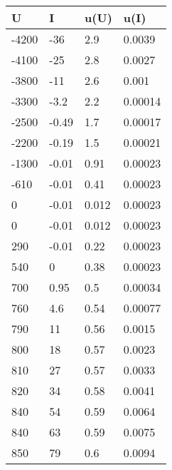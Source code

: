 \begin{table}[H]\centering 
 \begin{tabular}{|l|l|l|l|}
\hline
 \rowcolor[HTML]{EFEFEF} 
   U   &   I   &  u(U)  &  u(I)   \\ \hline

 -4200 &  -36  &  2.9   & 0.0039  \\ \hline
 -4100 &  -25  &  2.8   & 0.0027  \\ \hline
 -3800 &  -11  &  2.6   &  0.001  \\ \hline
 -3300 & -3.2  &  2.2   & 0.00014 \\ \hline
 -2500 & -0.49 &  1.7   & 0.00017 \\ \hline
 -2200 & -0.19 &  1.5   & 0.00021 \\ \hline
 -1300 & -0.01 &  0.91  & 0.00023 \\ \hline
 -610  & -0.01 &  0.41  & 0.00023 \\ \hline
   0   & -0.01 & 0.012  & 0.00023 \\ \hline
   0   & -0.01 & 0.012  & 0.00023 \\ \hline
  290  & -0.01 &  0.22  & 0.00023 \\ \hline
  540  &   0   &  0.38  & 0.00023 \\ \hline
  700  & 0.95  &  0.5   & 0.00034 \\ \hline
  760  &  4.6  &  0.54  & 0.00077 \\ \hline
  790  &  11   &  0.56  & 0.0015  \\ \hline
  800  &  18   &  0.57  & 0.0023  \\ \hline
  810  &  27   &  0.57  & 0.0033  \\ \hline
  820  &  34   &  0.58  & 0.0041  \\ \hline
  840  &  54   &  0.59  & 0.0064  \\ \hline
  840  &  63   &  0.59  & 0.0075  \\ \hline
  850  &  79   &  0.6   & 0.0094  \\ \hline

\end{tabular}
\end{table}